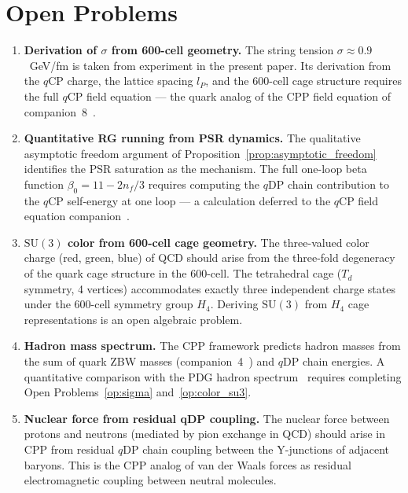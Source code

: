 \documentclass[12pt]{article}
\newcommand{\lP}{l_P}
\newcommand{\qCP}{q\mathrm{CP}}
\newcommand{\qDP}{q\mathrm{DP}}
\begin{document}
\section{Open Problems}
\label{sec:open}

\begin{enumerate}
\item \label{op:sigma}
  \textbf{Derivation of $\sigma$ from 600-cell geometry.}
  The string tension $\sigma \approx 0.9$~GeV/fm is taken from
  experiment in the present paper. Its derivation from the $\qCP$
  charge, the lattice spacing $\lP$, and the 600-cell cage structure
  requires the full $\qCP$ field equation — the quark analog of the
  CPP field equation of companion~8~\cite{c8}.

\item \label{op:running}
  \textbf{Quantitative RG running from PSR dynamics.}
  The qualitative asymptotic freedom argument of
  Proposition~\ref{prop:asymptotic_freedom} identifies the PSR
  saturation as the mechanism. The full one-loop beta function
  $\beta_0 = 11 - 2n_f/3$ requires computing the $\qDP$ chain
  contribution to the $\qCP$ self-energy at one loop — a
  calculation deferred to the $\qCP$ field equation companion~\cite{c8}.

\item \label{op:color_su3}
  \textbf{$\mathrm{SU}(3)$ color from 600-cell cage geometry.}
  The three-valued color charge (red, green, blue) of QCD should
  arise from the three-fold degeneracy of the quark cage structure
  in the 600-cell. The tetrahedral cage ($T_d$ symmetry, 4
  vertices) accommodates exactly three independent charge states
  under the 600-cell symmetry group $H_4$. Deriving
  $\mathrm{SU}(3)$ from $H_4$ cage representations is an open
  algebraic problem.

\item \textbf{Hadron mass spectrum.}
  The CPP framework predicts hadron masses from the sum of quark
  ZBW masses (companion~4~\cite{c4}) and $\qDP$ chain energies. A
  quantitative comparison with the PDG hadron spectrum~\cite{pdg2022}
  requires completing Open Problems~\ref{op:sigma}
  and~\ref{op:color_su3}.

\item \textbf{Nuclear force from residual qDP coupling.}
  The nuclear force between protons and neutrons (mediated by pion
  exchange in QCD) should arise in CPP from residual $\qDP$ chain
  coupling between the Y-junctions of adjacent baryons. This is
  the CPP analog of van der Waals forces as residual electromagnetic
  coupling between neutral molecules.
\end{enumerate}
\end{document}
